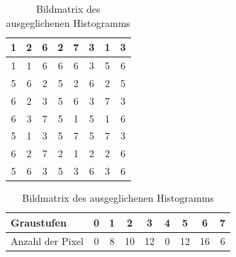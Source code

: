 \begin{table}[htb]
  \caption{Bildmatrix des ausgeglichenen Histogramms}
  \label{tab:hamatrix}
  \centering
  \begin{minipage}{\textwidth}
  \center
  \begin{tabular}{|c|c|c|c|c|c|c|c|}
  \hline
  1&2&6&2&7&3&1&3\\
  \hline
  1&1&6&6&6&3&5&6\\
  \hline
  5&6&2&5&2&6&2&5\\
  \hline
  6&2&3&5&6&3&7&3\\
  \hline
  6&3&7&5&1&5&1&6\\
  \hline
  5&1&3&5&7&5&7&3\\
  \hline
  6&2&7&2&1&2&2&6\\
  \hline
  5&6&3&5&3&6&3&6\\
  \hline
  \end{tabular}
  \end{minipage}
  \begin{minipage}{\textwidth}
  \hspace{\textwidth}
  \end{minipage}
  \begin{minipage}{\textwidth}
  \center
  \begin{tabular}{|l|c|c|c|c|c|c|c|c|}
  \hline
  Graustufen & 0 & 1 & 2 & 3 & 4 & 5 & 6 & 7\\
  \hline
  Anzahl der Pixel & 0 & 8 & 10 & 12 & 0 & 12 & 16 & 6\\
  \hline
  \end{tabular}
  \end{minipage}
  \end{table}
